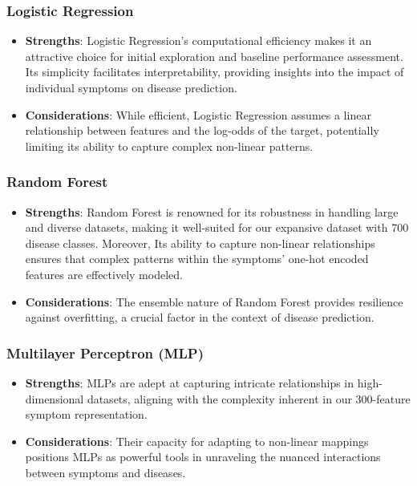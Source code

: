 \subsubsection{Logistic Regression}
\begin{itemize}
    \item \textbf{Strengths}: Logistic Regression's computational efficiency makes it an attractive choice for initial exploration and baseline performance assessment. Its simplicity facilitates interpretability, providing insights into the impact of individual symptoms on disease prediction.
    \item \textbf{Considerations}: While efficient, Logistic Regression assumes a linear relationship between features and the log-odds of the target, potentially limiting its ability to capture complex non-linear patterns.
\end{itemize}

\subsubsection{Random Forest}
\begin{itemize}
    \item \textbf{Strengths}: Random Forest is renowned for its robustness in handling large and diverse datasets, making it well-suited for our expansive dataset with 700 disease classes. Moreover, Its ability to capture non-linear relationships ensures that complex patterns within the symptoms' one-hot encoded features are effectively modeled.
    \item \textbf{Considerations}: The ensemble nature of Random Forest provides resilience against overfitting, a crucial factor in the context of disease prediction.
\end{itemize}

\subsubsection{Multilayer Perceptron (MLP)}
\begin{itemize}
    \item \textbf{Strengths}: MLPs are adept at capturing intricate relationships in high-dimensional datasets, aligning with the complexity inherent in our 300-feature symptom representation.
    \item \textbf{Considerations}: Their capacity for adapting to non-linear mappings positions MLPs as powerful tools in unraveling the nuanced interactions between symptoms and diseases.
\end{itemize}

